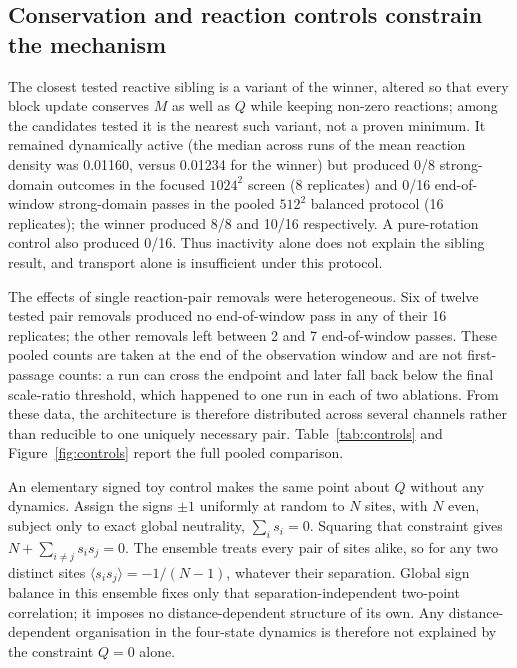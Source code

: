 \documentclass[11pt,a4paper]{article}
\begin{document}
\subsection{Conservation and reaction controls constrain the mechanism}
The closest tested reactive sibling is a variant of the winner, altered so that every block update conserves $M$ as well as $Q$ while keeping non-zero reactions; among the candidates tested it is the nearest such variant, not a proven minimum. It remained dynamically active (the median across runs of the mean reaction density was 0.01160, versus 0.01234 for the winner) but produced 0/8 strong-domain outcomes in the focused $1024^2$ screen (8 replicates) and 0/16 end-of-window strong-domain passes in the pooled $512^2$ balanced protocol (16 replicates); the winner produced 8/8 and 10/16 respectively. A pure-rotation control also produced 0/16. Thus inactivity alone does not explain the sibling result, and transport alone is insufficient under this protocol.

The effects of single reaction-pair removals were heterogeneous. Six of twelve tested pair removals produced no end-of-window pass in any of their 16 replicates; the other removals left between 2 and 7 end-of-window passes. These pooled counts are taken at the end of the observation window and are not first-passage counts: a run can cross the endpoint and later fall back below the final scale-ratio threshold, which happened to one run in each of two ablations. From these data, the architecture is therefore distributed across several channels rather than reducible to one uniquely necessary pair. Table~\ref{tab:controls} and Figure~\ref{fig:controls} report the full pooled comparison.

An elementary signed toy control makes the same point about $Q$ without any dynamics. Assign the signs $\pm1$ uniformly at random to $N$ sites, with $N$ even, subject only to exact global neutrality, $\sum_i s_i=0$. Squaring that constraint gives $N+\sum_{i\neq j}s_is_j=0$. The ensemble treats every pair of sites alike, so for any two distinct sites $\langle s_is_j\rangle=-1/(N-1)$, whatever their separation. Global sign balance in this ensemble fixes only that separation-independent two-point correlation; it imposes no distance-dependent structure of its own. Any distance-dependent organisation in the four-state dynamics is therefore not explained by the constraint $Q=0$ alone.

\begin{table}[tb]
\centering
\caption{Matched controls and single-pair ablations: end-of-window strong-domain passes under the pooled $512^2$ protocol, 16 replicates each.}
\label{tab:controls}
\resizebox{\linewidth}{!}{}
\end{table}
\end{document}
